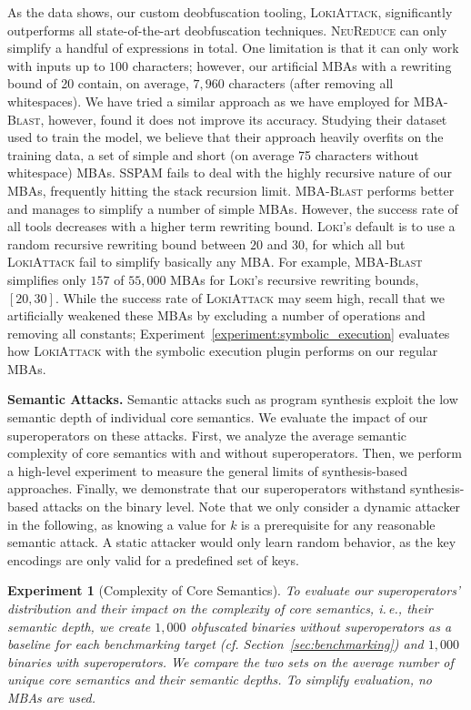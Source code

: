 \documentclass[letterpaper,twocolumn,10pt]{article}
\newcommand{\ie}{i.\,e.,\xspace}
\newcommand{\cf}{cf.\xspace}
\theoremstyle{customexample}
\theoremstyle{customexperiment}
\newtheorem{experiment}{Experiment}
\newcommand{\loki}{\textsc{Loki}\xspace}
\newcommand{\lokiattack}{\textsc{LokiAttack}\xspace}
\newcommand{\neureduce}{\textsc{NeuReduce}\xspace}
\newcommand{\sspam}{\textsc{SSPAM}\xspace}
\newcommand{\mbablast}{\textsc{MBA-Blast}\xspace}
\begin{document}
As the data shows, our custom deobfuscation tooling, \lokiattack, significantly outperforms all state-of-the-art deobfuscation techniques. \neureduce can only simplify a handful of expressions in total. One limitation is that it can only work with inputs up to $100$ characters; however, our artificial MBAs with a rewriting bound of 20 contain, on average, $7,960$ characters (after removing all whitespaces). We have tried a similar approach as we have employed for \mbablast, however, found it does not improve its accuracy. Studying their dataset used to train the model, we believe that their approach heavily overfits on the training data, a set of simple and short (on average 75 characters without whitespace) MBAs. \sspam fails to deal with the highly recursive nature of our MBAs, frequently hitting the stack recursion limit. \mbablast performs better and manages to simplify a number of simple MBAs. However, the success rate of all tools decreases with a higher term rewriting bound. \loki's default is to use a random recursive rewriting bound between $20$ and $30$, for which all but \lokiattack fail to simplify basically any MBA. For example, \mbablast simplifies only $157$ of $55,000$ MBAs for \loki's recursive rewriting bounds, $[20,30]$. While the success rate of \lokiattack may seem high, recall that we artificially weakened these MBAs by excluding a number of operations and removing all constants; Experiment~\ref{experiment:symbolic_execution} evaluates how \lokiattack with the symbolic execution plugin performs on our regular MBAs.



\textbf{Semantic Attacks.}\label{sec:evaluation:semantic_attacks}
Semantic attacks such as program synthesis exploit the low semantic depth of individual core semantics. We evaluate the impact of our superoperators on these attacks. First, we analyze the average semantic complexity of core semantics with and without superoperators. Then, we perform a high-level experiment to measure the general limits of synthesis-based approaches. Finally, we demonstrate that our superoperators withstand synthesis-based attacks on the binary level. Note that we only consider a dynamic attacker in the following, as knowing a value for $k$ is a prerequisite for any reasonable semantic attack. A static attacker would only learn random behavior, as the key encodings are only valid for a predefined set of keys.






\begin{experiment}[Complexity of Core Semantics]\label{experiment:core_semantics_complexity}
To evaluate our superoperators' distribution and their impact on the complexity of core semantics, \ie their semantic depth,
we create $1,000$ obfuscated binaries \emph{without} superoperators as a baseline for each benchmarking target (\cf Section~\ref{sec:benchmarking}) and $1,000$ binaries \emph{with} superoperators. We compare the two sets on the average number of unique core semantics and their semantic depths. To simplify evaluation, no MBAs are used.
\end{experiment}
\end{document}
